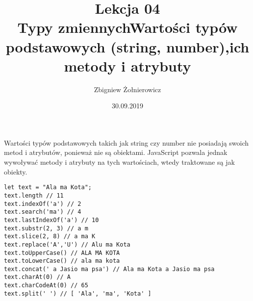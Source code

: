 \documentclass[a4paper]{article}
\begin{document}
\title{{\huge Lekcja 04} \\
    {\Large Typy zmiennych\linebreak Wartości typów podstawowych (string, number),\linebreak ich metody i atrybuty}}
\author{Zbigniew Żołnierowicz}
\date{30.09.2019}
\maketitle
Wartości typów podstawowych takich jak string czy number nie posiadają swoich metod i atrybutów, ponieważ nie są obiektami. JavaScript pozwala jednak wywoływać metody i atrybuty na tych wartościach, wtedy traktowane są jak obiekty.
\begin{verbatim}
let text = "Ala ma Kota";
text.length // 11
text.indexOf('a') // 2
text.search('ma') // 4
text.lastIndexOf('a') // 10
text.substr(2, 3) // a m
text.slice(2, 8) // a ma K
text.replace('A','U') // Alu ma Kota
text.toUpperCase() // ALA MA KOTA
text.toLowerCase() // ala ma kota
text.concat(' a Jasio ma psa') // Ala ma Kota a Jasio ma psa
text.charAt(0) // A
text.charCodeAt(0) // 65
text.split(' ') // [ 'Ala', 'ma', 'Kota' ]
\end{verbatim}
\end{document}
